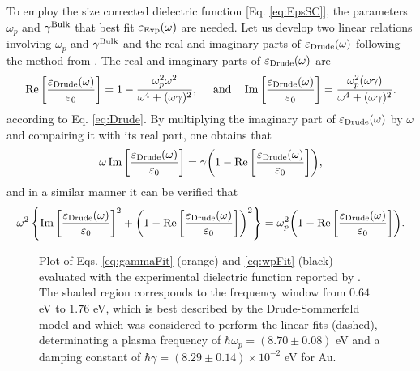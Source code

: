 To employ the size corrected dielectric function [Eq. \eqref{eq:EpsSC}], the parameters  $\omega_p$ and $\gamma^\text{\scriptsize Bulk}$ that best fit  $\varepsilon_\text{\scriptsize Exp}(\omega)$ are needed. Let us develop two linear relations involving $\omega_p$ and $\gamma^\text{\scriptsize Bulk}$ and the real and imaginary parts of $\varepsilon_\text{\scriptsize Drude}(\omega)$ following the method from \citeauthor{mendoza_herrera_determination_2014}. The real and imaginary parts of $\varepsilon_\text{\scriptsize Drude}(\omega)$ are 
%
\begin{align}
\Re\qty[\frac{\varepsilon_\text{\scriptsize Drude}(\omega)}{\varepsilon_0}] = 1 - \frac{\omega_p^2 \omega^2}{\omega^4 + (\omega\gamma)^2},
\qqtext{ and}
\Im\qty[\frac{\varepsilon_\text{\scriptsize Drude}(\omega)}{\varepsilon_0}]  = \frac{\omega_p^2  (\omega\gamma)}{\omega^4 + (\omega\gamma)^2}.
\end{align}
%
according to Eq. \eqref{eq:Drude}. By multiplying the imaginary part of $\varepsilon_\text{\scriptsize Drude}(\omega)$ by $\omega$ and compairing it with its real part, one obtains that
%
\begin{align}
\omega \Im\qty[\frac{\varepsilon_\text{\scriptsize Drude}(\omega)}{\varepsilon_0}] =
 \gamma \qty(1 - \Re\qty[\frac{\varepsilon_\text{\scriptsize Drude}(\omega)}{\varepsilon_0}]),
\label{eq:gammaFit}
\end{align}
%
and in a similar manner it can be verified that
\begin{align}
\omega^2\left\{ \Im\qty[\frac{\varepsilon_\text{\scriptsize Drude}(\omega)}{\varepsilon_0}]^2
			+ \qty(1-\Re\qty[\frac{\varepsilon_\text{\scriptsize Drude}(\omega)}{\varepsilon_0}])^2 \right\}
 = \omega_p^2 \qty(1 - \Re\qty[\frac{\varepsilon_\text{\scriptsize Drude}(\omega)}{\varepsilon_0}]).
 \label{eq:wpFit}
\end{align}
	\begin{figure}[b!]
	\def\svgwidth{.85\textwidth} \small\centering	
	\caption[Plasma frequency and damping constant determination for Au]{Plot of Eqs. \eqref{eq:gammaFit} (orange) and \eqref{eq:wpFit} (black) evaluated with the experimental dielectric function reported by \citeauthor{johnson_optical_1972} \cite{johnson_optical_1972}. The shaded region corresponds to the frequency window from $0.64$ eV to $1.76$ eV, which is best described by the Drude-Sommerfeld model and which was considered to perform the linear fits (dashed), determinating a plasma frequency of $\hbar\omega_p =(8.70\pm0.08)$ eV and a damping constant of $\hbar\gamma = (8.29 \pm 0.14)\times 10^{-2}$ eV for Au. }
	\label{fig:DrudeFit}
	\end{figure}	
